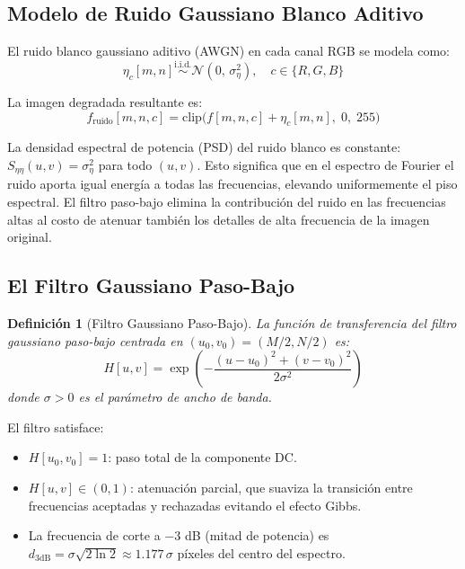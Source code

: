 \documentclass[conference]{IEEEtran}
\newtheorem{definicion}{Definición}
\begin{document}
\subsection{Modelo de Ruido Gaussiano Blanco Aditivo}

El ruido blanco gaussiano aditivo (AWGN) en cada canal RGB se modela como:
\begin{equation}
  \eta_c[m,n] \overset{\text{i.i.d.}}{\sim} \mathcal{N}(0,\,\sigma_\eta^2),
  \quad c\in\{R,G,B\}
  \label{eq:ruido}
\end{equation}

La imagen degradada resultante es:
\begin{equation}
  f_{\text{ruido}}[m,n,c]
  = \mathrm{clip}\bigl(f[m,n,c] + \eta_c[m,n],\; 0,\; 255\bigr)
  \label{eq:imagen_ruidosa}
\end{equation}

La densidad espectral de potencia (PSD) del ruido blanco es constante:
$S_{\eta\eta}(u,v) = \sigma_\eta^2$ para todo $(u,v)$. Esto significa que
en el espectro de Fourier el ruido aporta igual energía a todas las
frecuencias, elevando uniformemente el piso espectral. El filtro paso-bajo
elimina la contribución del ruido en las frecuencias altas al costo de
atenuar también los detalles de alta frecuencia de la imagen original.

\subsection{El Filtro Gaussiano Paso-Bajo}

\begin{definicion}[Filtro Gaussiano Paso-Bajo]
  La función de transferencia del filtro gaussiano paso-bajo centrada en
  $(u_0,v_0)=(M/2,N/2)$ es:
  \begin{equation}
    H[u,v] = \exp\!\left(-\frac{(u-u_0)^2+(v-v_0)^2}{2\sigma^2}\right)
    \label{eq:filtro_gaussiano}
  \end{equation}
  donde $\sigma>0$ es el \emph{parámetro de ancho de banda}.
\end{definicion}

El filtro satisface:
\begin{itemize}
  \item $H[u_0,v_0] = 1$: paso total de la componente DC.
  \item $H[u,v] \in (0,1)$: atenuación parcial, que suaviza la transición
    entre frecuencias aceptadas y rechazadas evitando el efecto Gibbs.
  \item La frecuencia de corte a $-3$ dB (mitad de potencia) es
    $d_{3\text{dB}} = \sigma\sqrt{2\ln 2} \approx 1.177\,\sigma$ píxeles
    del centro del espectro.
\end{itemize}
\end{document}

